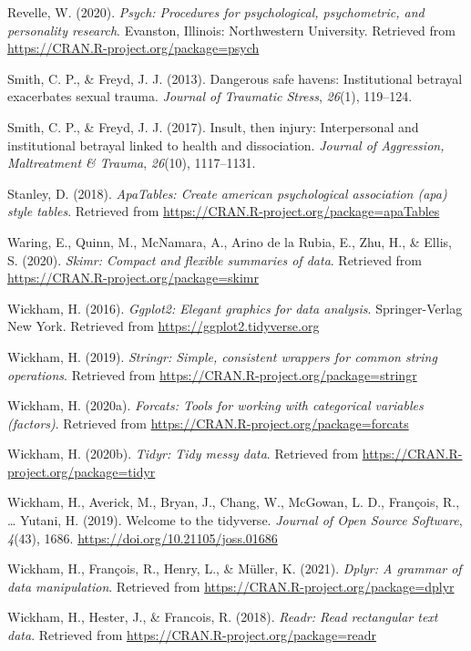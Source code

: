 \documentclass[
  english,
  man,draftall]{apa6}
\begin{document}
\leavevmode\hypertarget{ref-R-psych}{}%
Revelle, W. (2020). \emph{Psych: Procedures for psychological, psychometric, and personality research}. Evanston, Illinois: Northwestern University. Retrieved from \url{https://CRAN.R-project.org/package=psych}

\leavevmode\hypertarget{ref-smith2013}{}%
Smith, C. P., \& Freyd, J. J. (2013). Dangerous safe havens: Institutional betrayal exacerbates sexual trauma. \emph{Journal of Traumatic Stress}, \emph{26}(1), 119--124.

\leavevmode\hypertarget{ref-smith2017}{}%
Smith, C. P., \& Freyd, J. J. (2017). Insult, then injury: Interpersonal and institutional betrayal linked to health and dissociation. \emph{Journal of Aggression, Maltreatment \& Trauma}, \emph{26}(10), 1117--1131.

\leavevmode\hypertarget{ref-R-apaTables}{}%
Stanley, D. (2018). \emph{ApaTables: Create american psychological association (apa) style tables}. Retrieved from \url{https://CRAN.R-project.org/package=apaTables}

\leavevmode\hypertarget{ref-R-skimr}{}%
Waring, E., Quinn, M., McNamara, A., Arino de la Rubia, E., Zhu, H., \& Ellis, S. (2020). \emph{Skimr: Compact and flexible summaries of data}. Retrieved from \url{https://CRAN.R-project.org/package=skimr}

\leavevmode\hypertarget{ref-R-ggplot2}{}%
Wickham, H. (2016). \emph{Ggplot2: Elegant graphics for data analysis}. Springer-Verlag New York. Retrieved from \url{https://ggplot2.tidyverse.org}

\leavevmode\hypertarget{ref-R-stringr}{}%
Wickham, H. (2019). \emph{Stringr: Simple, consistent wrappers for common string operations}. Retrieved from \url{https://CRAN.R-project.org/package=stringr}

\leavevmode\hypertarget{ref-R-forcats}{}%
Wickham, H. (2020a). \emph{Forcats: Tools for working with categorical variables (factors)}. Retrieved from \url{https://CRAN.R-project.org/package=forcats}

\leavevmode\hypertarget{ref-R-tidyr}{}%
Wickham, H. (2020b). \emph{Tidyr: Tidy messy data}. Retrieved from \url{https://CRAN.R-project.org/package=tidyr}

\leavevmode\hypertarget{ref-R-tidyverse}{}%
Wickham, H., Averick, M., Bryan, J., Chang, W., McGowan, L. D., François, R., \ldots{} Yutani, H. (2019). Welcome to the tidyverse. \emph{Journal of Open Source Software}, \emph{4}(43), 1686. \url{https://doi.org/10.21105/joss.01686}

\leavevmode\hypertarget{ref-R-dplyr}{}%
Wickham, H., François, R., Henry, L., \& Müller, K. (2021). \emph{Dplyr: A grammar of data manipulation}. Retrieved from \url{https://CRAN.R-project.org/package=dplyr}

\leavevmode\hypertarget{ref-R-readr}{}%
Wickham, H., Hester, J., \& Francois, R. (2018). \emph{Readr: Read rectangular text data}. Retrieved from \url{https://CRAN.R-project.org/package=readr}

\endgroup
\end{document}
